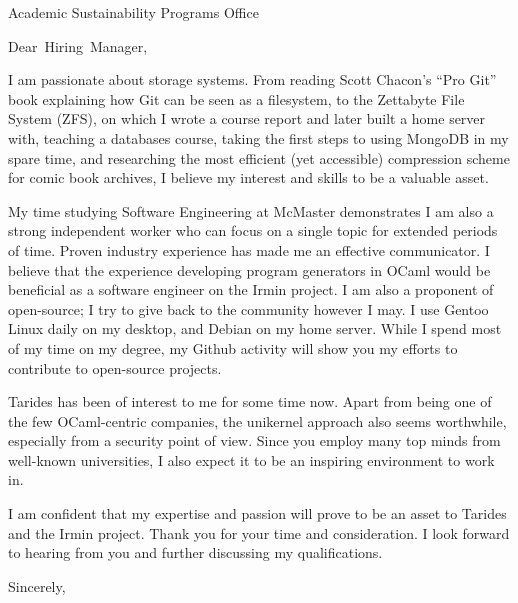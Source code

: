 \documentclass[
fontsize=12pt,
paper=letter,
parskip=half,
enlargefirstpage=on,    %
fromalign=right,        %
fromphone=on,           %
fromemail=on,
fromrule=aftername,     %
addrfield=off,           %
backaddress=off,         %
subject=beforeopening,  %
locfield=narrow,        %
foldmarks=off,           %
]{scrlttr2}
\renewcommand{\\}{\ {\large\textperiodcentered}\ }
\begin{document}

\begin{letter}{Academic Sustainability Programs Office}


\opening{Dear~Hiring~Manager,}

I am passionate about storage systems.
From reading Scott Chacon's ``Pro Git'' book explaining how Git can be seen as a filesystem, to the Zettabyte File System (ZFS), on which I wrote a course report and later built a home server with, teaching a databases course, taking the first steps to using MongoDB in my spare time, and researching the most efficient (yet accessible) compression scheme for comic book archives, I believe my interest and skills to be a valuable asset.

My time studying Software Engineering at McMaster demonstrates I am also a strong independent worker who can focus on a single topic for extended periods of time.
Proven industry experience has made me an effective communicator.
I believe that the experience developing program generators in OCaml would be beneficial as a software engineer on the Irmin project.
I am also a proponent of open-source; I try to give back to the community however I may.
I use Gentoo Linux daily on my desktop, and Debian on my home server. While I spend most of my time on my degree, my Github activity will show you my efforts to contribute to open-source projects.

Tarides has been of interest to me for some time now.
Apart from being one of the few OCaml-centric companies, the unikernel approach also seems worthwhile, especially from a security point of view.
Since you employ many top minds from well-known universities, I also expect it to be an inspiring environment to work in.

I am confident that my expertise and passion will prove to be an asset to Tarides and the Irmin project.
Thank you for your time and consideration.
I look forward to hearing from you and further discussing my qualifications.
\closing{Sincerely,}


\end{letter}
\end{document}
